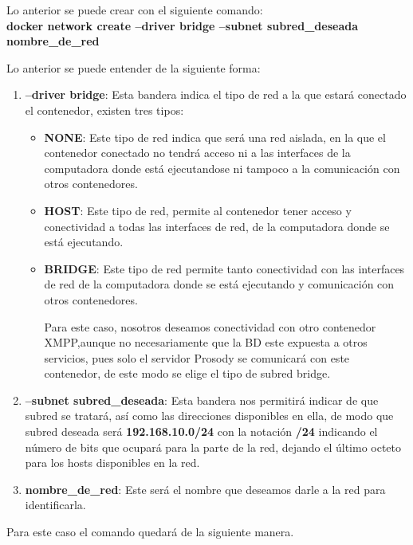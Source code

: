\documentclass[10pt,letterpaper]{article}
\begin{document}
Lo anterior se puede crear con el siguiente comando:\\

\textbf{docker network create --driver bridge --subnet subred\_deseada nombre\_de\_red}

Lo anterior se puede entender de la siguiente forma:

\begin{enumerate}
\item \textbf{--driver bridge}: Esta bandera indica el tipo de red a la que estará conectado el contenedor, existen tres tipos:
	\begin{itemize}
		\item \textbf{NONE}: Este tipo de red indica que será una red aislada, en la que el contenedor conectado no tendrá acceso ni a las interfaces de la computadora donde está ejecutandose ni tampoco a la comunicación con otros contenedores.
		
		\item \textbf{HOST}: Este tipo de red, permite al contenedor tener acceso y conectividad a todas las interfaces de red, de la computadora donde se está ejecutando.
		
		\item \textbf{BRIDGE}: Este tipo de red permite tanto conectividad con las interfaces de red de la computadora donde se está ejecutando y comunicación con otros contenedores.
		
Para este caso, nosotros deseamos conectividad con otro contenedor XMPP,aunque no necesariamente que la BD este expuesta a otros servicios, pues solo el servidor Prosody se comunicará con este contenedor, de este modo se elige el tipo de subred bridge.
	\end{itemize}

\item \textbf{--subnet subred\_deseada}: Esta bandera nos permitirá indicar de que subred se tratará, así como las direcciones disponibles en ella, de modo que subred deseada será \textbf{192.168.10.0/24} con la notación \textbf{/24} indicando el número de bits que ocupará para la parte de la red, dejando el último octeto para los hosts disponibles en la red.

\item \textbf{nombre\_de\_red}: Este será el nombre que deseamos darle a la red para identificarla.
\end{enumerate}

Para este caso el comando quedará de la siguiente manera.\\
\end{document}
